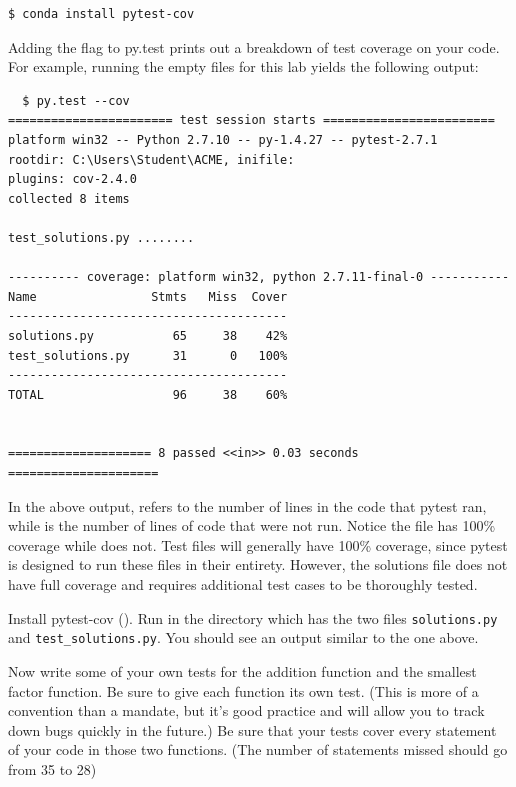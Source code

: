 \begin{lstlisting}
$ conda install pytest-cov
\end{lstlisting}

Adding the flag  to py.test prints out a breakdown of test coverage on your code. For example, running the empty files for this lab yields the following output:

\begin{lstlisting}
  $ py.test --cov
======================= test session starts ========================
platform win32 -- Python 2.7.10 -- py-1.4.27 -- pytest-2.7.1
rootdir: C:\Users\Student\ACME, inifile:
plugins: cov-2.4.0
collected 8 items

test_solutions.py ........

---------- coverage: platform win32, python 2.7.11-final-0 -----------
Name                Stmts   Miss  Cover
---------------------------------------
solutions.py           65     38    42%
test_solutions.py      31      0   100%
---------------------------------------
TOTAL                  96     38    60%


==================== 8 passed <<in>> 0.03 seconds =====================
\end{lstlisting}

In the above output,  refers to the number of lines in the code that pytest ran, while  is the number of lines of code that were not run.
Notice the file  has 100\% coverage while  does not. Test files will generally have 100\% coverage, since pytest is designed to run these files in their entirety. However, the solutions file does not have full coverage and requires additional test cases to be thoroughly tested.

\begin{problem}
Install pytest-cov ().
Run  in the directory which has the two files \texttt{solutions.py} and \texttt{test\_solutions.py}. You should see an output similar to the one above.

Now write some of your own tests for the addition function and the smallest factor function. Be sure to give each function its own test. (This is more of a convention than a mandate,
but it's good practice and will allow you to track down bugs quickly in the future.) Be sure that your tests cover every statement of your code in those two functions.
(The number of statements missed should go from 35 to 28)
\end{problem}


